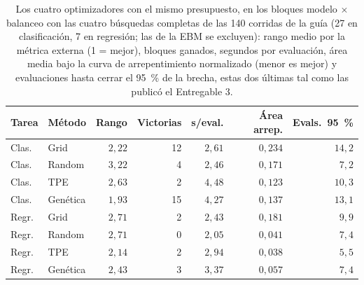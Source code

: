 \begin{table}[tbp]
  \centering\small\setlength{\tabcolsep}{3pt}
  \caption{Los cuatro optimizadores con el mismo presupuesto, en los bloques modelo $\times$ balanceo con las cuatro búsquedas completas de las 140 corridas de la guía (27 en clasificación, 7 en regresión; las de la EBM se excluyen): rango medio por la métrica externa (1 = mejor), bloques ganados, segundos por evaluación, área media bajo la curva de arrepentimiento normalizado (menor es mejor) y evaluaciones hasta cerrar el 95~\% de la brecha, estas dos últimas tal como las publicó el Entregable 3.}
  \label{tab:optimizadores_res}
  \begin{tabular}{@{}l l r r r r r@{}}
    \toprule
    Tarea & Método & Rango & Victorias & s/eval. & Área arrep. & Evals.\ 95~\% \\
    \midrule
    Clas. & Grid & $2{,}22$ & 12 & $2{,}61$ & $0{,}234$ & $14{,}2$ \\
    Clas. & Random & $3{,}22$ & 4 & $2{,}46$ & $0{,}171$ & $7{,}2$ \\
    Clas. & TPE & $2{,}63$ & 2 & $4{,}48$ & $0{,}123$ & $10{,}3$ \\
    Clas. & Genética & $1{,}93$ & 15 & $4{,}27$ & $0{,}137$ & $13{,}1$ \\
    \midrule
    Regr. & Grid & $2{,}71$ & 2 & $2{,}43$ & $0{,}181$ & $9{,}9$ \\
    Regr. & Random & $2{,}71$ & 0 & $2{,}05$ & $0{,}041$ & $7{,}4$ \\
    Regr. & TPE & $2{,}14$ & 2 & $2{,}94$ & $0{,}038$ & $5{,}5$ \\
    Regr. & Genética & $2{,}43$ & 3 & $3{,}37$ & $0{,}057$ & $7{,}4$ \\
    \bottomrule
  \end{tabular}
\end{table}
